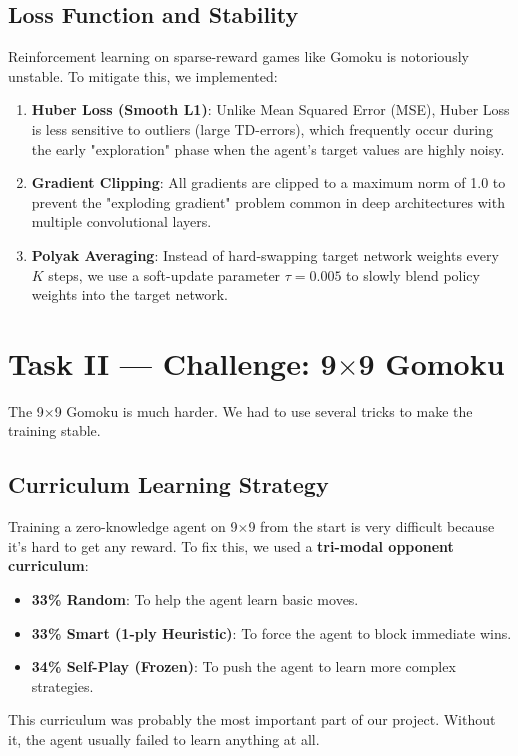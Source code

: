 \documentclass[9pt,a4paper,twocolumn,twoside]{rho-class/rho}
\begin{document}
    \subsection{Loss Function and Stability}
        Reinforcement learning on sparse-reward games like Gomoku is notoriously unstable. To mitigate this, we implemented:
        \begin{enumerate}
            \item \textbf{Huber Loss (Smooth L1)}: Unlike Mean Squared Error (MSE), Huber Loss is less sensitive to outliers (large TD-errors), which frequently occur during the early "exploration" phase when the agent's target values are highly noisy.
            \item \textbf{Gradient Clipping}: All gradients are clipped to a maximum norm of 1.0 to prevent the "exploding gradient" problem common in deep architectures with multiple convolutional layers.
            \item \textbf{Polyak Averaging}: Instead of hard-swapping target network weights every $K$ steps, we use a soft-update parameter $\tau=0.005$ to slowly blend policy weights into the target network.
        \end{enumerate}

\section{Task II — Challenge: 9$\times$9 Gomoku}
    The 9$\times$9 Gomoku is much harder. We had to use several tricks to make the training stable.

    \subsection{Curriculum Learning Strategy}
        Training a zero-knowledge agent on 9$\times$9 from the start is very difficult because it's hard to get any reward. To fix this, we used a \textbf{tri-modal opponent curriculum}:
        \begin{itemize}
            \item \textbf{33\% Random}: To help the agent learn basic moves.
            \item \textbf{33\% Smart (1-ply Heuristic)}: To force the agent to block immediate wins.
            \item \textbf{34\% Self-Play (Frozen)}: To push the agent to learn more complex strategies.
        \end{itemize}
        This curriculum was probably the most important part of our project. Without it, the agent usually failed to learn anything at all.
\end{document}
